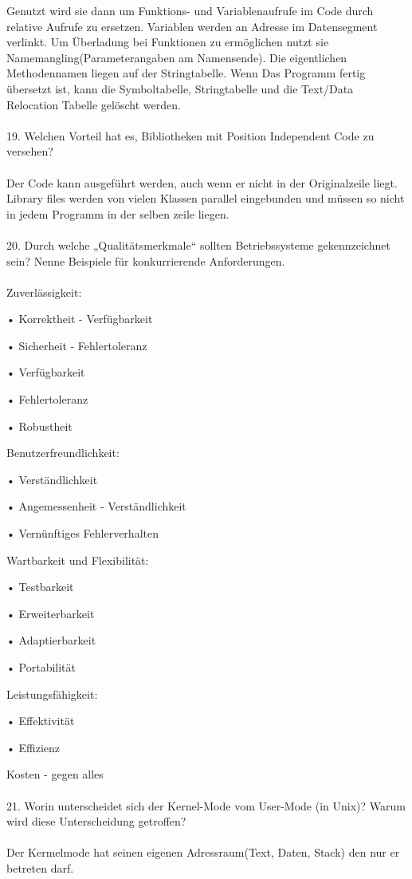 \documentclass{article}
\newcommand\tab[1][1cm]{\hspace*{#1}}
\begin{document}
Genutzt wird sie dann um Funktions- und Variablenaufrufe im Code durch relative Aufrufe zu ersetzen. Variablen werden an Adresse im Datensegment verlinkt. Um \"Uberladung bei Funktionen zu erm\"oglichen nutzt sie Namemangling(Parameterangaben am Namensende). Die eigentlichen Methodennamen liegen auf der Stringtabelle.  Wenn Das Programm fertig \"ubersetzt ist, kann die Symboltabelle, Stringtabelle und die Text/Data Relocation Tabelle gel\"oscht werden.
\\
\\
19. Welchen Vorteil hat es, Bibliotheken mit Position Independent Code zu versehen?
\\
\\
Der Code kann ausgef\"uhrt werden, auch wenn er nicht in der Originalzeile liegt. Library files werden von vielen Klassen parallel eingebunden und m\"ussen so nicht in jedem Programm in der selben zeile liegen.
\\
\\
20. Durch welche „Qualitätsmerkmale“ sollten Betriebssysteme gekennzeichnet sein? Nenne
Beispiele für konkurrierende Anforderungen.
\\
\\
Zuverlässigkeit:

\tab • Korrektheit - Verfügbarkeit

\tab • Sicherheit - Fehlertoleranz

\tab • Verfügbarkeit

\tab • Fehlertoleranz

\tab • Robustheit

Benutzerfreundlichkeit:

\tab • Verständlichkeit

\tab • Angemessenheit - Verständlichkeit

\tab • Vernünftiges Fehlerverhalten

Wartbarkeit und Flexibilität:

\tab • Testbarkeit

\tab • Erweiterbarkeit

\tab • Adaptierbarkeit

\tab • Portabilität

Leistungsfähigkeit:

\tab • Effektivität

\tab • Effizienz

Kosten - gegen alles
\\
\\
21. Worin unterscheidet sich der Kernel-Mode vom User-Mode (in Unix)? Warum wird diese
Unterscheidung getroffen?
\\
\\
Der Kermelmode hat seinen eigenen Adressraum(Text, Daten, Stack) den nur er betreten darf.
\end{document}
